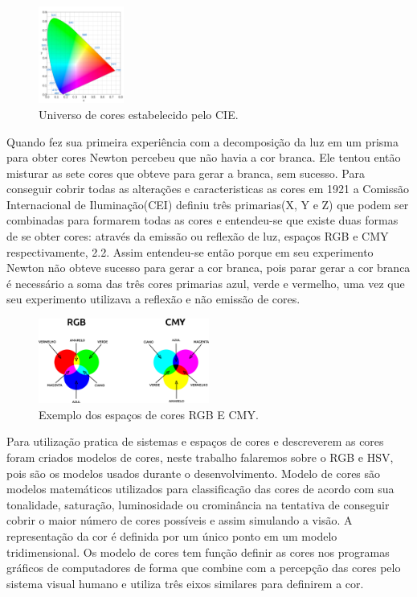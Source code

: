  \begin{figure}[!h]
	\centering
	\includegraphics[width=0.25\textwidth]{graficocie.pdf}
	\caption{Universo de cores estabelecido pelo CIE.}
	\label{EspacodeCores}
\end{figure}


Quando fez sua primeira experiência com a decomposição da luz em um prisma para obter cores Newton percebeu que não havia a cor branca. Ele tentou então misturar as sete cores que obteve para gerar a branca, sem sucesso. 
 Para conseguir cobrir todas as alterações e caracteristicas as cores em 1921 a Comissão Internacional de Iluminação(CEI)\cite{Souto:2003} definiu três primarias(X, Y e Z) que podem ser combinadas para formarem todas as cores e entendeu-se que existe duas formas de se obter cores: através da emissão ou reflexão de luz, espaços RGB e CMY respectivamente, \figurename{ 2.2}. Assim entendeu-se então porque em seu experimento Newton não obteve sucesso para gerar a cor branca, pois parar gerar a cor branca é necessário a soma das três cores primarias azul, verde e vermelho, uma vez que seu experimento utilizava a reflexão e não emissão de cores.
 \begin{figure}[!h]
	\centering
	\includegraphics[width=0.5\textwidth]{espacos.pdf}
	\caption{Exemplo dos espaços de cores RGB E CMY.}
	\label{EspacodeCores}
\end{figure}



Para utilização pratica de sistemas e espaços de cores e descreverem as cores foram criados modelos de cores, neste trabalho falaremos sobre o RGB e HSV, pois são os modelos usados durante o desenvolvimento.
Modelo de cores são modelos matemáticos utilizados para classificação das cores de acordo com sua tonalidade, saturação, luminosidade ou crominância na tentativa de conseguir cobrir o maior número de cores possíveis e assim simulando a visão. A representação da cor é definida por um único ponto em um modelo tridimensional. 
Os modelo de cores tem função definir as cores nos programas gráficos de computadores de forma que combine com a 
percepção das cores pelo sistema visual humano e utiliza três eixos similares para definirem a cor\cite{Leao:2005}.

